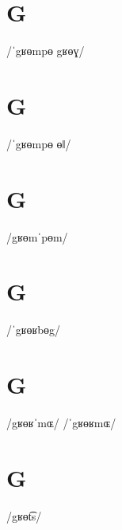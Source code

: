 \documentclass[10pt,a4paper,twoside]{book}
\begin{document}
\section*{G}

\begin{multicols}{3}
 {/ˈgʁɵmpɵ gʁɵɣ/} {}
\end{multicols}

\section*{G}

\begin{multicols}{3}
 {/ˈgʁɵmpɵ ɵǁ/} {}
\end{multicols}

\section*{G}

\begin{multicols}{3}
 {/gʁɵmˈpɵm/} {}
\end{multicols}

\section*{G}

\begin{multicols}{3}
 {/ˈgʁɵʁbɵg/} {}
\end{multicols}

\section*{G}

\begin{multicols}{3}
 {/gʁɵʁˈmɶ/} {}
 {/ˈgʁɵʁmɶ/} {}
\end{multicols}

\section*{G}

\begin{multicols}{3}
 {/gʁɵt͡s/} {}
\end{multicols}
\end{document}
